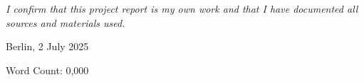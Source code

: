 \chapter*{}
\vspace{17cm}
\hfill\parbox{8cm}{
\raggedleft
	\textit{I confirm that this project report is my own work and that I have documented all sources and materials used.}\par 
	\vspace{1em}
	Berlin, 2 July 2025

	\vspace{3em}
	{\footnotesize Word Count: 0,000}
}
\thispagestyle{plain}